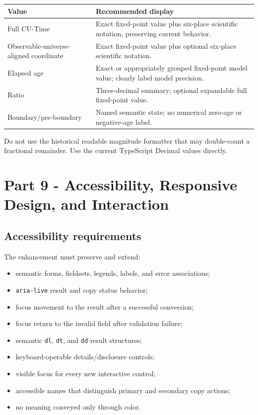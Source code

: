 \documentclass[11pt,letterpaper]{article}
\begin{document}
\begin{tabularx}{\textwidth}{L{2.25in}Y}
\toprule
\textbf{Value} & \textbf{Recommended display} \\
\midrule
Full CU-Time & Exact fixed-point value plus six-place scientific notation, preserving current behavior. \\
Observable-universe-aligned coordinate & Exact fixed-point value plus optional six-place scientific notation. \\
Elapsed age & Exact or appropriately grouped fixed-point model value; clearly label model precision. \\
Ratio & Three-decimal summary; optional expandable full fixed-point value. \\
Boundary/pre-boundary & Named semantic state; no numerical zero-age or negative-age label. \\
\bottomrule
\end{tabularx}

Do not use the historical readable magnitude formatter that may double-count a
fractional remainder. Use the current TypeScript Decimal values directly.

\section{Part 9 - Accessibility, Responsive Design, and Interaction}

\subsection{Accessibility requirements}

The enhancement must preserve and extend:

\begin{itemize}
    \item semantic forms, fieldsets, legends, labels, and error associations;
    \item \texttt{aria-live} result and copy status behavior;
    \item focus movement to the result after a successful conversion;
    \item focus return to the invalid field after validation failure;
    \item semantic \texttt{dl}, \texttt{dt}, and \texttt{dd} result structures;
    \item keyboard-operable details/disclosure controls;
    \item visible focus for every new interactive control;
    \item accessible names that distinguish primary and secondary copy actions;
    \item no meaning conveyed only through color.
\end{itemize}
\end{document}
